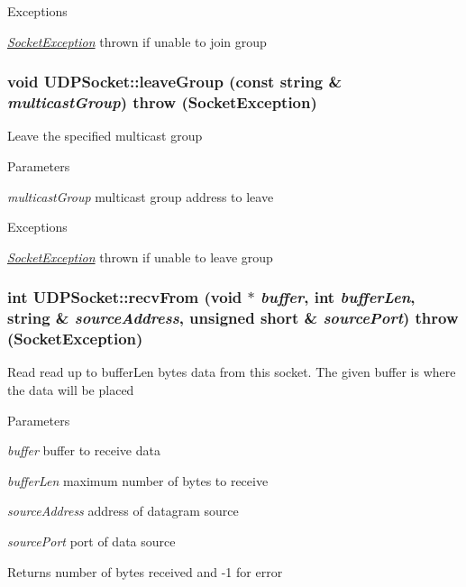 \begin{DoxyExceptions}{Exceptions}
\item[{\em \hyperlink{classSocketException}{SocketException}}]thrown if unable to join group \end{DoxyExceptions}
\hypertarget{classUDPSocket_a78835eaeca8a5ac039b4579c795e3640}{
\subsubsection[{leaveGroup}]{\setlength{\rightskip}{0pt plus 5cm}void UDPSocket::leaveGroup (const string \& {\em multicastGroup})  throw ({\bf SocketException})}}
\label{classUDPSocket_a78835eaeca8a5ac039b4579c795e3640}
Leave the specified multicast group 
\begin{DoxyParams}{Parameters}
\item[{\em multicastGroup}]multicast group address to leave \end{DoxyParams}

\begin{DoxyExceptions}{Exceptions}
\item[{\em \hyperlink{classSocketException}{SocketException}}]thrown if unable to leave group \end{DoxyExceptions}
\hypertarget{classUDPSocket_abcd5c064e2496bd8b1888fd4e1b68949}{
\subsubsection[{recvFrom}]{\setlength{\rightskip}{0pt plus 5cm}int UDPSocket::recvFrom (void $\ast$ {\em buffer}, \/  int {\em bufferLen}, \/  string \& {\em sourceAddress}, \/  unsigned short \& {\em sourcePort})  throw ({\bf SocketException})}}
\label{classUDPSocket_abcd5c064e2496bd8b1888fd4e1b68949}
Read read up to bufferLen bytes data from this socket. The given buffer is where the data will be placed 
\begin{DoxyParams}{Parameters}
\item[{\em buffer}]buffer to receive data \item[{\em bufferLen}]maximum number of bytes to receive \item[{\em sourceAddress}]address of datagram source \item[{\em sourcePort}]port of data source \end{DoxyParams}
\begin{DoxyReturn}{Returns}
number of bytes received and -\/1 for error 
\end{DoxyReturn}

